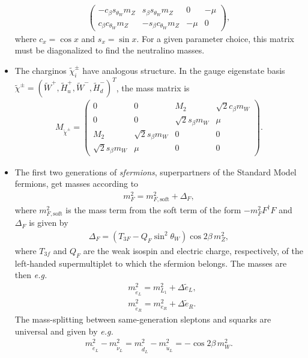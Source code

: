 \documentclass[twoside,english]{uiofysmaster}
\begin{document}
\begin{itemize}
\begin{align}
\begin{pmatrix}
 			- c_\beta s_{\theta_W} m_Z &  s_\beta s_{\theta_W} m_Z & 0 & -\mu \\
			 c_\beta c_{\theta_W} m_Z & - s_\beta c_{\theta_W} m_Z & -\mu & 0
 		\end{pmatrix},
 	\end{align}
 	where $c_x = \cos x$ and $s_x = \sin x$. For a given parameter choice, this matrix must be diagonalized to find the neutralino masses.
 	\item The charginos $\tilde\chi_i^\pm$ have analogous structure. In the gauge eigenstate basis $\tilde \chi^{\pm} = (\tilde W^+, \tilde H_u^+, \tilde W^-, \tilde H_d^-)^T$, the mass matrix is
 	\begin{align}
 		M_{\tilde \chi^\pm} = \begin{pmatrix}
 			0 & 0 & M_2 & \sqrt{2} c_\beta m_W  \\
 			0 & 0 & \sqrt{2} s_\beta m_W & \mu \\
 			M_2 & \sqrt{2} s_\beta m_W & 0 & 0\\
 			\sqrt{2} s_\beta m_W & \mu & 0 & 0
 		\end{pmatrix}.
 	\end{align}
 	\item The first two generations of {\it sfermions}, superpartners of the Standard Model fermions, get masses according to
 	\begin{align}
 		m^2_F = m^2_{F,\mathrm{soft}} + \Delta_F,
 	\end{align}
 	where $m^2_{F,\mathrm{soft}}$ is the mass term from the soft term of the form $-m^2_F F^\dag F$ and $\Delta_F$ is given by
 	\begin{align}
 		\Delta_F = (T_{3F} - Q_F \sin^2\theta_W)\cos 2\beta \, m^2_Z,
 	\end{align}
 	where $T_{3f}$ and $Q_F$ are the weak isospin and electric charge, respectively, of the left-handed supermultiplet to which the sfermion belongs. The masses are then {\it e.g.}\
 	\begin{align}
 		&m^2_{\tilde e_L} = m^2_{L_1} + \Delta \tilde e_L,\\
 		&m^2_{\tilde e_R} = m^2_{e_R} + \Delta \tilde e_R.
 	\end{align}
 	The mass-splitting between same-generation sleptons and squarks are universal and given by {\it e.g.}\ %
 	\begin{align}
 		m^2_{\tilde e_L} - m^2_{\tilde \nu_L} = m^2_{\tilde d_L} - m^2_{\tilde u_L} = -\cos 2\beta \, m_W^2.
 	\end{align}

\end{itemize}
\end{document}

